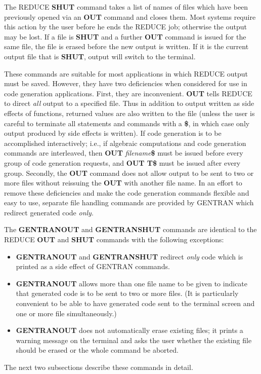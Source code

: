 The REDUCE {\bf SHUT} command takes a list of names of files
which have been previously opened via an {\bf OUT} command and closes
them.  Most systems require this action by the user before he
ends the REDUCE job; otherwise the output may be
lost.  If a file is {\bf SHUT} and a further {\bf OUT}
command is issued for the same file, the file is erased before the
new output is written.  If it is the current output file that is 
{\bf SHUT}, output will switch to the terminal.

These commands are suitable for most applications in which REDUCE
output must be saved.  However, they have two deficiencies when
considered for use in code generation applications.  First, they are
inconvenient.  {\bf OUT} tells REDUCE to direct {\it all\/} output to a
specified file.  Thus in addition to output written as side effects
of functions, returned values are also written to the file (unless the
user is careful to terminate all statements and commands with a {\bf \$}, in
which case only output produced by side effects is written).  If code
generation is to be accomplished
interactively; i.e., if algebraic computations and
code generation commands are interleaved, then {\bf OUT}
{\it filename\/}{\bf \$}
must be issued before every group of code generation requests, and
{\bf OUT T\$} must be issued after every group.  Secondly, the {\bf OUT}
command does not allow output to be sent to two or more files without
reissuing the {\bf OUT} with another file name.  In
an effort to remove these deficiencies and make the code
generation commands flexible and easy to use, separate
file handling commands are provided by GENTRAN which redirect generated
code {\it only}.

The {\bf GENTRANOUT} and {\bf GENTRANSHUT} commands are identical to the REDUCE
{\bf OUT} and {\bf SHUT} commands with the following exceptions:
\begin{itemize}
\item {\bf GENTRANOUT} and {\bf GENTRANSHUT} redirect {\it only\/} code which is
printed as a side effect of GENTRAN commands.
\item {\bf GENTRANOUT} allows more than one file name to be given
to indicate that generated code is to be sent to two or more
files.  (It is particularly convenient to be able to
have generated code sent to
the terminal screen and one or more file simultaneously.)
\item {\bf GENTRANOUT} does not automatically erase existing files; it prints
a warning message on the terminal and asks the user whether the existing
file should be erased or the whole command be aborted.
\end{itemize}
The next two subsections describe these commands in detail.

